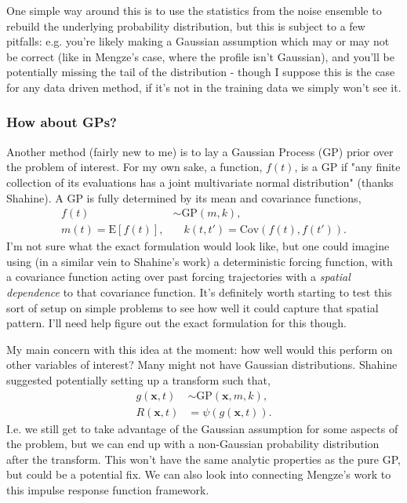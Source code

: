 One simple way around this is to use the statistics from the noise ensemble to rebuild the underlying probability distribution, but this is subject to a few pitfalls: e.g. you're likely making a Gaussian assumption which may or may not be correct (like in Mengze's case, where the profile isn't Gaussian), and you'll be potentially missing the tail of the distribution - though I suppose this is the case for any data driven method, if it's not in the training data we simply won't see it.

\subsubsection{How about GPs?}

Another method (fairly new to me) is to lay a Gaussian Process (GP) prior over the problem of interest. For my own sake, a function, $f(t)$, is a GP if "any finite collection of its evaluations has a joint multivariate normal distribution" (thanks Shahine). A GP is fully determined by its mean and covariance functions,
\begin{align}
  f(t) &\sim \text{GP}(m,k),\\
  m(t) = \text{E}[f(t)], &\quad k(t,t') = \text{Cov}(f(t),f(t')).
\end{align}
I'm not sure what the exact formulation would look like, but one could imagine using (in a similar vein to Shahine's work) a deterministic forcing function, with a covariance function acting over past forcing trajectories with a \textit{spatial dependence} to that covariance function. It's definitely worth starting to test this sort of setup on simple problems to see how well it could capture that spatial pattern. I'll need help figure out the exact formulation for this though.

My main concern with this idea at the moment: how well would this perform on other variables of interest? Many might not have Gaussian distributions. Shahine suggested potentially setting up a transform such that,
\begin{align}
  g(\mathbf{x},t) &\sim \text{GP}(\mathbf{x},m,k), \\
  R(\mathbf{x},t) &= \psi(g(\mathbf{x},t)).
\end{align}
I.e. we still get to take advantage of the Gaussian assumption for some aspects of the problem, but we can end up with a non-Gaussian probability distribution after the transform. This won't have the same analytic properties as the pure GP, but could be a potential fix. We can also look into connecting Mengze's work to this impulse response function framework.

